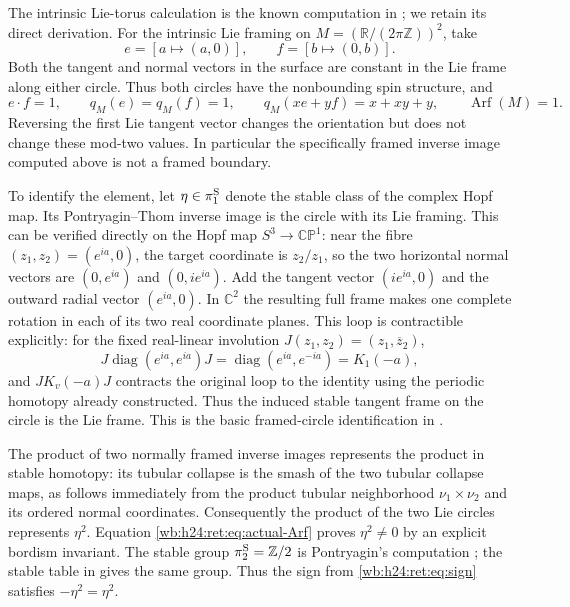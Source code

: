 The intrinsic Lie-torus calculation is the known computation in \cite[Example~3.8, p.~6]{DebrayGunningham2018Root}; we retain its direct derivation. For the intrinsic Lie framing on
\(M=(\mathbb R/(2\pi\mathbb Z))^2\), take
\[
 e=[a\mapsto(a,0)],\qquad f=[b\mapsto(0,b)].
\]
Both the tangent and normal vectors in the surface are constant in
the Lie frame along either circle.  Thus both circles have the
nonbounding spin structure, and
\begin{equation}
 e\mathbin{\cdot}f=1,\qquad q_M(e)=q_M(f)=1,
 \qquad q_M(xe+yf)=x+xy+y,
 \qquad \operatorname{Arf}(M)=1.
 \label{wb:h24:ret:eq:actual-Arf}
\end{equation}
Reversing the first Lie tangent vector changes the orientation but
does not change these mod-two values.  In particular the
specifically framed inverse image computed above is not a framed
boundary.

To identify the element, let \(\eta\in\pi_1^{\rm S}\) denote the
stable class of the complex Hopf map.  Its Pontryagin--Thom inverse
image is the circle with its Lie framing.  This can be verified
directly on the Hopf map \(S^3\to\mathbb{CP}^1\): near the fibre
\((z_1,z_2)=(e^{ia},0)\), the target coordinate is \(z_2/z_1\), so
the two horizontal normal vectors are \((0,e^{ia})\) and
\((0,ie^{ia})\).  Add the tangent vector \((ie^{ia},0)\) and the
outward radial vector \((e^{ia},0)\).  In \(\mathbb C^2\) the resulting
full frame makes one complete rotation in each of its two real
coordinate planes.  This loop is contractible explicitly: for the
fixed real-linear involution \(J(z_1,z_2)=(z_1,\overline z_2)\),
\[
 J\operatorname{diag}(e^{ia},e^{ia})J=\operatorname{diag}(e^{ia},e^{-ia})=K_1(-a),
\]
and \(JK_v(-a)J\) contracts the original loop to the identity using
the periodic homotopy already constructed.  Thus the induced stable
tangent frame on the circle is the Lie frame.  This is the basic
framed-circle identification in \cite{Pontryagin1955Root}.

The product of two normally framed inverse images represents the
product in stable homotopy: its tubular collapse is the smash of
the two tubular collapse maps, as follows immediately from the
product tubular neighborhood \(\nu_1\times\nu_2\) and its ordered
normal coordinates.  Consequently the product of the two Lie
circles represents \(\eta^2\).  Equation \eqref{wb:h24:ret:eq:actual-Arf}
proves \(\eta^2\ne0\) by an explicit bordism invariant.  The
stable group \(\pi_2^{\rm S}=\mathbb Z/2\) is Pontryagin's computation
\cite{Pontryagin1950Root,Pontryagin1955Root}; the stable table in
\cite[pp.~384--385]{Hatcher2002} gives the same group.  Thus the sign from
\eqref{wb:h24:ret:eq:sign} satisfies \(-\eta^2=\eta^2\).

